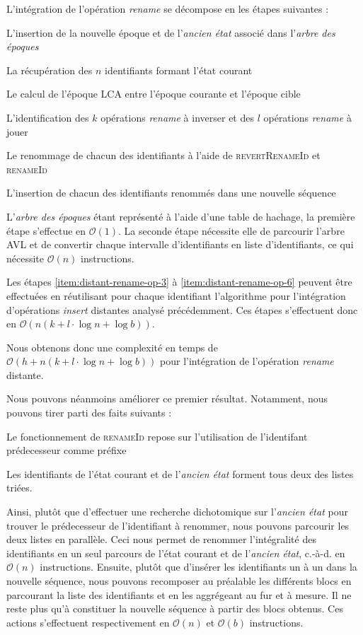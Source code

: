 \documentclass[12pt]{thesul}
\newcommand{\ie}{c.-à-d. }
\newcommand\bigO[1]{$\mathcal{O}(#1)$}
\begin{document}
L'intégration de l'opération \emph{rename} se décompose en les étapes suivantes :
\begin{enumerate*}[label=(\roman*)]
  \item L'insertion de la nouvelle époque et de l'\emph{ancien état} associé dans l'\emph{arbre des époques}
  \item La récupération des $n$ identifiants formant l'état courant
  \item \label{item:distant-rename-op-3} Le calcul de l'époque \ac{LCA} entre l'époque courante et l'époque cible
  \item L'identification des $k$ opérations \emph{rename} à inverser et des $l$ opérations \emph{rename} à jouer
  \item Le renommage de chacun des identifiants à l'aide de \textsc{revertRenameId} et \textsc{renameId}
  \item \label{item:distant-rename-op-6} L'insertion de chacun des identifiants renommés dans une nouvelle séquence
\end{enumerate*}
L'\emph{arbre des époques} étant représenté à l'aide d'une table de hachage, la première étape s'effectue en \bigO{1}.
La seconde étape nécessite elle de parcourir l'arbre AVL et de convertir chaque intervalle d'identifiants en liste d'identifiants, ce qui nécessite \bigO{n} instructions.

Les étapes \ref{item:distant-rename-op-3} à \ref{item:distant-rename-op-6} peuvent être effectuées en réutilisant pour chaque identifiant l'algorithme pour l'intégration d'opérations \emph{insert} distantes analysé précédemment.
Ces étapes s'effectuent donc en \bigO{n(k + l \cdot \log{}n + \log{}b)}.

Nous obtenons donc une complexité en temps de \bigO{h + n(k + l \cdot \log{}n + \log{}b)} pour l'intégration de l'opération \emph{rename} distante.

Nous pouvons néanmoins améliorer ce premier résultat.
Notamment, nous pouvons tirer parti des faits suivants :
\begin{enumerate*}[label=(\roman*)]
  \item Le fonctionnement de \textsc{renameId} repose sur l'utilisation de l'identifant prédecesseur comme préfixe
  \item Les identifiants de l'état courant et de l'\emph{ancien état} forment tous deux des listes triées.
\end{enumerate*}
Ainsi, plutôt que d'effectuer une recherche dichotomique sur l'\emph{ancien état} pour trouver le prédecesseur de l'identifiant à renommer, nous pouvons parcourir les deux listes en parallèle.
Ceci nous permet de renommer l'intégralité des identifiants en un seul parcours de l'état courant et de l'\emph{ancien état}, \ie en \bigO{n} instructions.
Ensuite, plutôt que d'insérer les identifiants un à un dans la nouvelle séquence, nous pouvons recomposer au préalable les différents blocs en parcourant la liste des identifiants et en les aggrégeant au fur et à mesure.
Il ne reste plus qu'à constituer la nouvelle séquence à partir des blocs obtenus.
Ces actions s'effectuent respectivement en \bigO{n} et \bigO{b} instructions.
\end{document}
